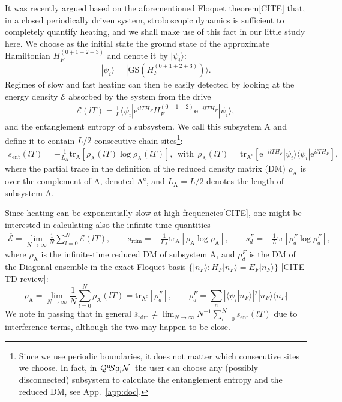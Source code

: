 \documentclass{SciPost}
\newcommand\0{\scalebox{-1}[1]{0}}
\newcommand{\qspin}{$\mathcal{Q}^{\mathrm{u}}\!\mathcal{S}\uprho\mathrm{\text{\textexclamdown}}\mathcal{N}$}
\begin{document}
It was recently argued based on the aforementioned Floquet theorem[CITE] that, in a closed periodically driven system, stroboscopic dynamics is sufficient to completely quantify heating, and we shall make use of this fact in our little study here. We choose as the initial state the ground state of the approximate Hamiltonian $H_F^{(0+1+2+3)}$ and denote it by $|\psi_i\rangle$:
\begin{equation}
|\psi_i\rangle = |\mathrm{GS}(H_F^{(0+1+2+3)})\rangle.
\end{equation}
Regimes of slow and fast heating can then be easily detected by looking at the energy density $\mathcal{E}$ absorbed by the system from the drive
\begin{eqnarray}
\mathcal{E}(lT) = \frac{1}{L}\langle\psi_i|\mathrm e^{ilT H_F}H_F^{(0+1+2)}\mathrm e^{-ilT H_F}|\psi_i\rangle, 
\label{eq:Floquet_E}
\end{eqnarray}
and the entanglement entropy of a subsystem. We call this subsystem A and define it to contain $L/2$ consecutive chain sites\footnote{Since we use periodic boundaries, it does not matter which consecutive sites we choose. In fact, in \qspin\ the user can choose any (possibly disconnected) subsystem to calculate the entanglement entropy and the reduced DM, see App.~\ref{app:doc}.}:
\begin{eqnarray}
s_\mathrm{ent}(lT) = -\frac{1}{L_\mathrm{A}}\mathrm{tr}_\mathrm{A}\left[ \rho_\mathrm{A}(lT)\log\rho_\mathrm{A}(lT) \right], \ \ \mathrm{with}\ \ \rho_\mathrm{A}(lT) = \mathrm{tr}_\mathrm{A^c}\left[ \mathrm e^{-ilT H_F}|\psi_i\rangle\langle\psi_i|\mathrm e^{ilT H_F}\right],
\label{eq:Floquet_S}
\end{eqnarray}
where the partial trace in the definition of the reduced density matrix (DM) $\rho_\mathrm{A}$ is over the complement of A, denoted $\mathrm{A^c}$, and $L_\mathrm{A}=L/2$ denotes the length of subsystem A.

Since heating can be exponentially slow at high frequencies[CITE], one might be interested in calculating also the infinite-time quantities
\begin{eqnarray}
\overline{\mathcal{E}} = \lim_{N\to\infty}\frac{1}{N}\sum_{l=0}^{N}\mathcal{E}(lT), \qquad
\overline{s}_\mathrm{rdm} = -\frac{1}{L_\mathrm{A}}\mathrm{tr}_\mathrm{A}\left[ \overline{\rho}_\mathrm{A}\log\overline{\rho}_\mathrm{A} \right], \qquad
s_d^F = -\frac{1}{L}\mathrm{tr} \left[ \rho^F_d\log\rho^F_d \right], 
\end{eqnarray}   
where $\overline{\rho}_\mathrm{A}$ is the infinite-time reduced DM of subsystem A, and $\rho^F_d$ is the DM of the Diagonal ensemble in the exact Floquet basis $\{ |n_F\rangle\!\!: H_F|n_F\rangle=E_F|n_F\rangle \}$ [CITE TD review]:
\begin{equation*}
\overline{\rho}_\mathrm{A} = \lim_{N\to\infty}\frac{1}{N}\sum_{l=0}^{N}\rho_\mathrm{A}(lT)= \mathrm{tr}_\mathrm{A^c}\left[\rho_d^F\right], \qquad
\rho_d^F = \sum_{n} |\langle \psi_i|n_F\rangle |^2 |n_F\rangle\langle n_F|
\end{equation*}
We note in passing that in general $\overline{s}_\mathrm{rdm}\neq \lim_{N\to\infty}N^{-1}\sum_{l=0}^{N}s_\mathrm{ent}(lT)$ due to interference terms, although the two may happen to be close.
\end{document}
